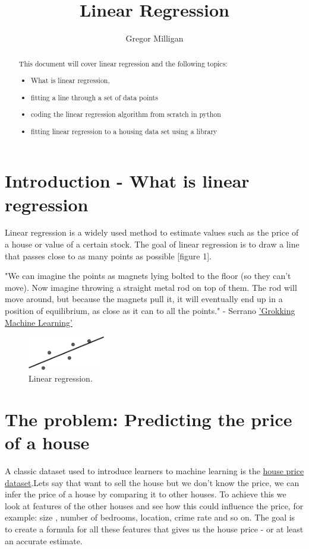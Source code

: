 \documentclass{report}
\title{Linear Regression}
\author{Gregor Milligan}
\begin{document}
\maketitle

\begin{abstract}
This document will cover linear regression and the following topics:

\begin{itemize}
\item What is linear regression,
\item fitting a line through a set of data points
\item coding the linear regression algorithm from scratch in python
\item fitting linear regression to a housing data set using a library
\end{itemize}
\end{abstract}

\section{Introduction - What is linear regression}
Linear regression is a widely used method to estimate values such as the price of a house or value of a certain stock. The goal of linear regression is to draw a line that passes close to as many points as possible [figure 1].

"We can imagine the points as magnets lying bolted to the floor (so they can’t move). Now imagine throwing a straight metal rod on top of them. The rod will move around, but because the magnets pull it, it will eventually end up in a position of equilibrium, as close as it can to all the points." - Serrano \href{https://livebook.manning.com/book/grokking-machine-learning/chapter-3/26}{'Grokking Machine Learning'}



\begin{figure}
\centering
\includegraphics[width=0.3\textwidth]{lr figure 2.png}
\caption{\label{fig:lr}Linear regression.}
\end{figure}

\section{The problem: Predicting the price of a house}
A classic dataset used to introduce learners to machine learning is the \href{https://github.com/luisguiserrano/manning/blob/master/Chapter_3_Linear_Regression/Hyderabad.csv}{house price dataset}.Lets say that want to sell the house but we don't know the price, we can infer the price of a house by comparing it to other houses. To achieve this we look at features of the other houses and see how this could influence the price, for example: size , number of bedrooms, location, crime rate and so on. The goal is to create a formula for all these features that gives us the house price - or at least an accurate estimate. 
\end{document}
